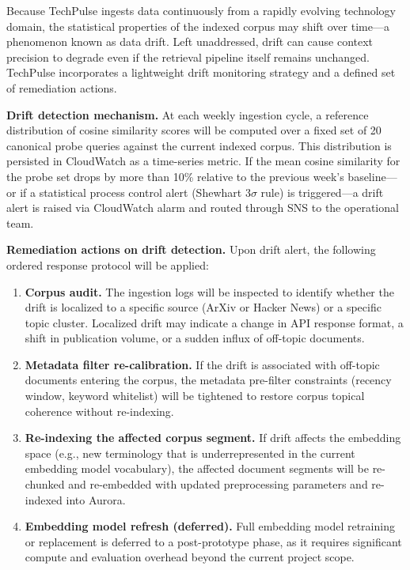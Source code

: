\documentclass[12pt,a4paper]{report}
\begin{document}
Because TechPulse ingests data continuously from a rapidly evolving technology domain, the statistical properties of the indexed corpus may shift over time—a phenomenon known as data drift. Left unaddressed, drift can cause context precision to degrade even if the retrieval pipeline itself remains unchanged. TechPulse incorporates a lightweight drift monitoring strategy and a defined set of remediation actions.

\textbf{Drift detection mechanism.} At each weekly ingestion cycle, a reference distribution of cosine similarity scores will be computed over a fixed set of 20 canonical probe queries against the current indexed corpus. This distribution is persisted in CloudWatch as a time-series metric. If the mean cosine similarity for the probe set drops by more than 10\% relative to the previous week's baseline—or if a statistical process control alert (Shewhart $3\sigma$ rule) is triggered—a drift alert is raised via CloudWatch alarm and routed through SNS to the operational team.

\textbf{Remediation actions on drift detection.} Upon drift alert, the following ordered response protocol will be applied:

\begin{enumerate}[leftmargin=0.5in]
  \item \textbf{Corpus audit.} The ingestion logs will be inspected to identify whether the drift is localized to a specific source (ArXiv or Hacker News) or a specific topic cluster. Localized drift may indicate a change in API response format, a shift in publication volume, or a sudden influx of off-topic documents.

  \item \textbf{Metadata filter re-calibration.} If the drift is associated with off-topic documents entering the corpus, the metadata pre-filter constraints (recency window, keyword whitelist) will be tightened to restore corpus topical coherence without re-indexing.

  \item \textbf{Re-indexing the affected corpus segment.} If drift affects the embedding space (e.g., new terminology that is underrepresented in the current embedding model vocabulary), the affected document segments will be re-chunked and re-embedded with updated preprocessing parameters and re-indexed into Aurora.

  \item \textbf{Embedding model refresh (deferred).} Full embedding model retraining or replacement is deferred to a post-prototype phase, as it requires significant compute and evaluation overhead beyond the current project scope.
\end{enumerate}
\end{document}
